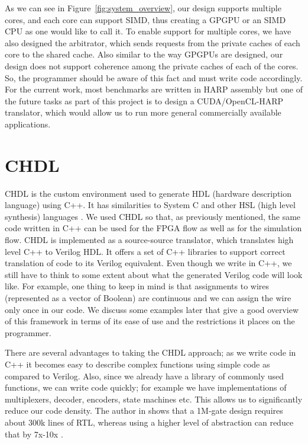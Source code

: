 As we can see in Figure~\ref{fig:system_overview}, our design supports multiple cores, and each core can support SIMD, thus creating a GPGPU or an SIMD CPU as one would like to call it. To enable support for multiple cores, we have also designed the arbitrator, which sends requests from the private caches of each core to the shared cache. Also similar to the way GPGPUs are designed, our design does not support coherence among the private caches of each of the cores. So, the programmer should be aware of this fact and must write code accordingly. For the current work, most benchmarks are written in HARP assembly but one of the future tasks as part of this project is to design a CUDA/OpenCL-HARP translator, which would allow us to run more general commercially available applications.
\section{ CHDL }
CHDL is the custom environment used to generate HDL (hardware description language) using C++. It has similarities to System C and other HSL (high level synthesis) languages \cite{hls_overview}. We used CHDL so that, as previously mentioned, the same code written in C++ can be used for the FPGA flow as well as for the simulation flow. CHDL is implemented as a source-source translator, which translates high level C++ to Verilog HDL. It offers a set of C++ libraries to support correct translation of code to its Verilog equivalent. Even though we write in C++, we still have to think to some extent about what the generated Verilog code will look like. For example, one thing to keep in mind is that assignments to wires (represented as a vector of Boolean) are continuous and we can assign the wire only once in our code. We discuss some examples later that give a good overview of this framework in terms of its ease of use and the restrictions it places on the programmer.

There are several advantages to taking the CHDL approach; as we write code in C++ it becomes easy to describe complex functions using simple code as compared to Verilog. Also, since we already have a library of commonly used functions, we can write code quickly; for example we have implementations of multiplexers, decoder, encoders, state machines etc. This allows us to significantly reduce our code density. The author in \cite{codedensity} shows that a 1M-gate design requires about 300k lines of RTL, whereas using a higher level of abstraction can reduce that by 7x-10x \cite{hls_overview}.

